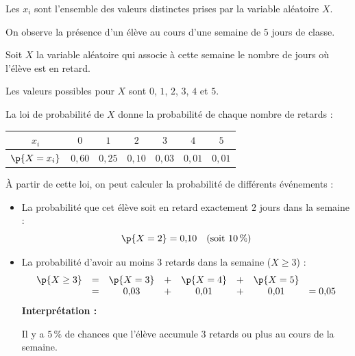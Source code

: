\begin{remarque}
	Les $x_{i}$ sont l'ensemble des valeurs distinctes prises par la variable aléatoire $X$.
\end{remarque}

\begin{ex}
	On observe la présence d'un élève au cours d'une semaine de $5$ jours de classe.

	Soit $X$ la variable aléatoire qui associe à cette semaine le nombre de jours où l'élève est en retard.

	Les valeurs possibles pour $X$ sont $0$, $1$, $2$, $3$, $4$ et $5$.

	La loi de probabilité de $X$ donne la probabilité de chaque nombre de retards :

	\begin{center}
		\begin{tabular}{|c|c|c|c|c|c|c|} \hline
			\ccg $x_i$       & $0$      & $1$      & $2$      & $3$      & $4$      & $5$      \\ \hline
			\ccg $\p{X=x_i}$ & $0{,}60$ & $0{,}25$ & $0{,}10$ & $0{,}03$ & $0{,}01$ & $0{,}01$ \\ \hline
		\end{tabular}
	\end{center}

	À partir de cette loi, on peut calculer la probabilité de différents événements :
	\begin{itemize}
		\item La probabilité que cet élève soit en retard exactement $2$ jours dans la semaine :
		      \[
			      \p{X=2} = 0{,}10 \quad (\text{soit } 10\,\%)
		      \]
		\item La probabilité d'avoir au moins $3$ retards dans la semaine ($X \ge 3$) :
		      \[
			      \begin{array}{rccccccl}
				      \p{X \ge 3} & = & \p{X=3} & + & \p{X=4} & + & \p{X=5} &          \\
				                  & = & 0{,}03  & + & 0{,}01  & + & 0{,}01  & = 0{,}05
			      \end{array}
		      \]
		      \textbf{Interprétation :}

			  Il y a $5\,\%$ de chances que l'élève accumule $3$ retards ou plus au cours de la semaine.
	\end{itemize}
\end{ex}

